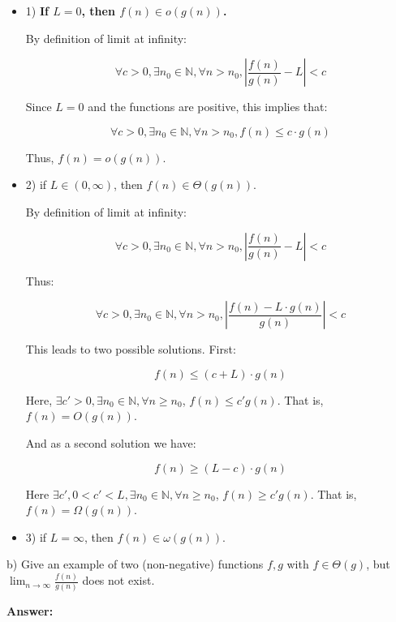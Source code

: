 \documentclass{article}
\begin{document}
\begin{itemize}
\item 1) \textbf{If $L = 0$, then $f(n) \in o(g(n))$.}

By definition of limit at infinity:

$$\forall c > 0, \exists n_0 \in \mathbb{N}, \forall n > n_0, \left | \frac{f(n)}{g(n)} - L \right | < c$$

Since $L=0$ and the functions are positive, this implies that:

$$\forall c > 0, \exists n_0 \in \mathbb{N}, \forall n > n_0, f(n) \le c \cdot g(n)$$

Thus, $f(n) = o(g(n))$.

\bigskip

\item 2) if $L \in (0, \infty)$, then $f(n) \in \Theta(g(n))$.

By definition of limit at infinity:

$$\forall c > 0, \exists n_0 \in \mathbb{N}, \forall n > n_0, \left | \frac{f(n)}{g(n)} - L \right | < c$$

Thus:

$$\forall c > 0, \exists n_0 \in \mathbb{N}, \forall n > n_0,  \left | \frac{f(n) - L \cdot g(n)}{g(n)} \right | < c$$

This leads to two possible solutions. First:

$$f(n) \le (c + L) \cdot g(n)$$

Here, $\exists c' > 0, \exists n_0 \in \mathbb{N}, \forall n \ge n_0$, $f(n) \le c' g(n)$.
That is, $f(n) = O(g(n))$.

\bigskip And as a second solution we have:

$$f(n) \ge (L - c) \cdot g(n)$$

Here $\exists c', 0 < c' < L, \exists n_0 \in \mathbb{N}, \forall n \ge n_0$, $f(n) \ge c' g(n)$. That is, $f(n) = \Omega(g(n))$.

\bigskip
\item 3) if $L = \infty$, then $f(n) \in \omega(g(n))$.


\end{itemize}

\noindent b) Give an example of two (non-negative) functions $f,g$ with $f \in \Theta(g)$, but $\lim_{n \rightarrow \infty}\frac{f(n)}{g(n)}$ does not exist.


\bigskip \noindent \textbf{Answer:}
\end{document}
